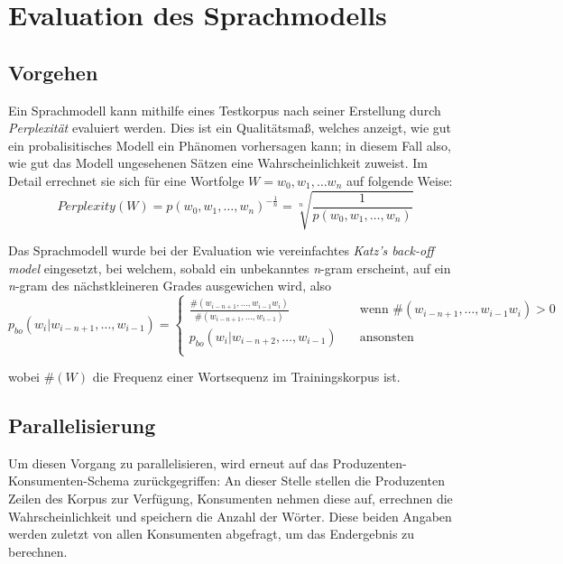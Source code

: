 \documentclass[a4paper,12pt]{scrartcl}
\begin{document}
\section{Evaluation des Sprachmodells} 

    \subsection{Vorgehen}

    Ein Sprachmodell kann mithilfe eines Testkorpus nach seiner Erstellung durch \emph{Perplexität} evaluiert werden. Dies ist ein Qualitätsmaß, welches anzeigt, wie gut ein probalisitisches Modell ein Phänomen vorhersagen kann; in diesem Fall also, wie gut das Modell ungesehenen Sätzen eine Wahrscheinlichkeit zuweist. Im Detail errechnet sie sich für eine Wortfolge $W = w_0, w_1, \ldots w_n$ auf folgende Weise:
    \[ Perplexity(W) = p(w_0, w_1, \ldots, w_n)^{-\frac{1}{n}} = \sqrt[n]{\frac{1}{p(w_0, w_1, \ldots, w_n)}}\]

    Das Sprachmodell wurde bei der Evaluation wie vereinfachtes \emph{Katz's back-off model} eingesetzt, bei welchem, sobald ein unbekanntes \emph{n}-gram erscheint, auf ein \emph{n}-gram des nächstkleineren Grades ausgewichen wird, also 
    \[ p_{bo}(w_i|w_{i-n+1}, \ldots, w_{i-1}) = 
        \begin{cases}
            \frac{\#(w_{i-n+1}, \ldots, w_{i-1}w_i)}{\#(w_{i-n+1}, \ldots, w_{i-1})} & \quad \text{wenn } \#(w_{i-n+1}, \ldots, w_{i-1}w_i) > 0\\
            p_{bo}(w_i|w_{i-n+2}, \ldots, w_{i-1}) & \quad \text{ansonsten} \\
        \end{cases}
    \]

    wobei $\#(W)$ die Frequenz einer Wortsequenz im Trainingskorpus ist\cite{katz}.

    \subsection{Parallelisierung}

    Um diesen Vorgang zu parallelisieren, wird erneut auf das Produzenten-Konsumenten-Schema zurückgegriffen: An dieser Stelle stellen die Produzenten Zeilen des Korpus zur Verfügung, Konsumenten nehmen diese auf, errechnen die Wahrscheinlichkeit und speichern die Anzahl der Wörter. Diese beiden Angaben werden zuletzt von allen Konsumenten abgefragt, um das Endergebnis zu berechnen.
\end{document}
